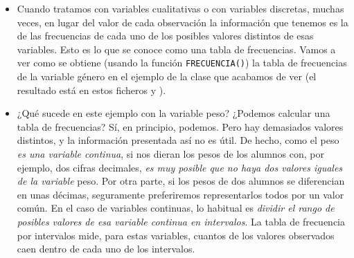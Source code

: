 \begin{itemize}
    \item Cuando tratamos con variables cualitativas o con variables discretas, muchas veces, en lugar del valor de cada observación la información que tenemos es la de las frecuencias de cada uno de los posibles valores distintos de esas variables. Esto es lo que se conoce como una {\sf tabla de frecuencias}. Vamos a ver como se obtiene (usando la función {\tt FRECUENCIA()}) la tabla de frecuencias de la variable género en el ejemplo de la clase que acabamos de ver (el resultado está en estos ficheros  y ).

    \item ¿Qué sucede en este ejemplo con la variable peso? ¿Podemos calcular una tabla de frecuencias? Sí, en principio, podemos. Pero hay demasiados valores distintos, y la información presentada así no es útil. De hecho, como el peso {\em es una variable continua}, si nos dieran los pesos de los alumnos con, por ejemplo, dos cifras decimales, {\em es muy posible que no haya dos valores iguales de la variable} peso. Por otra parte, si los pesos de dos alumnos se diferencian en unas décimas, seguramente preferiremos representarlos todos por un valor común. En el caso de variables continuas, lo habitual es {\em dividir el rango de posibles valores de esa variable continua en intervalos}. La {\sf tabla de frecuencia por intervalos} mide, para estas variables, cuantos de los valores observados caen dentro de cada uno de los intervalos.


\end{itemize}
